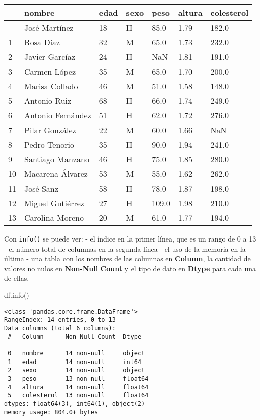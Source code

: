 \documentclass[
  letterpaper,
  DIV=11,
  numbers=noendperiod]{scrreprt}
\newenvironment{Shaded}{\begin{snugshade}}{\end{snugshade}}
\newcommand{\NormalTok}[1]{\textcolor[rgb]{0.00,0.23,0.31}{#1}}
\begin{document}
\begin{longtable}[]{@{}lllllll@{}}
\toprule\noalign{}
& nombre & edad & sexo & peso & altura & colesterol \\
\midrule\noalign{}
\endhead
\bottomrule\noalign{}
\endlastfoot
0 & José Martínez & 18 & H & 85.0 & 1.79 & 182.0 \\
1 & Rosa Díaz & 32 & M & 65.0 & 1.73 & 232.0 \\
2 & Javier Garcíaz & 24 & H & NaN & 1.81 & 191.0 \\
3 & Carmen López & 35 & M & 65.0 & 1.70 & 200.0 \\
4 & Marisa Collado & 46 & M & 51.0 & 1.58 & 148.0 \\
5 & Antonio Ruiz & 68 & H & 66.0 & 1.74 & 249.0 \\
6 & Antonio Fernández & 51 & H & 62.0 & 1.72 & 276.0 \\
7 & Pilar González & 22 & M & 60.0 & 1.66 & NaN \\
8 & Pedro Tenorio & 35 & H & 90.0 & 1.94 & 241.0 \\
9 & Santiago Manzano & 46 & H & 75.0 & 1.85 & 280.0 \\
10 & Macarena Álvarez & 53 & M & 55.0 & 1.62 & 262.0 \\
11 & José Sanz & 58 & H & 78.0 & 1.87 & 198.0 \\
12 & Miguel Gutiérrez & 27 & H & 109.0 & 1.98 & 210.0 \\
13 & Carolina Moreno & 20 & M & 61.0 & 1.77 & 194.0 \\
\end{longtable}

Con \texttt{info()} se puede ver: - el índice en la primer línea, que es
un rango de 0 a 13 - el número total de columnas en la segunda línea -
el uso de la memoria en la última - una tabla con los nombres de las
columnas en \textbf{Column}, la cantidad de valores no nulos en
\textbf{Non-Null Count} y el tipo de dato en \textbf{Dtype} para cada
una de ellas.

\begin{Shaded}
\begin{Highlighting}[]
\NormalTok{df.info()}
\end{Highlighting}
\end{Shaded}

\begin{verbatim}
<class 'pandas.core.frame.DataFrame'>
RangeIndex: 14 entries, 0 to 13
Data columns (total 6 columns):
 #   Column      Non-Null Count  Dtype  
---  ------      --------------  -----  
 0   nombre      14 non-null     object 
 1   edad        14 non-null     int64  
 2   sexo        14 non-null     object 
 3   peso        13 non-null     float64
 4   altura      14 non-null     float64
 5   colesterol  13 non-null     float64
dtypes: float64(3), int64(1), object(2)
memory usage: 804.0+ bytes
\end{verbatim}
\end{document}

